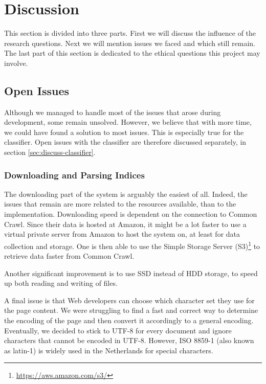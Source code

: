 \chapter{Discussion}\label{sec:discussion}

This section is divided into three parts. First we will discuss the influence of the research questions. Next we will mention issues we faced and which still remain. The last part of this section is dedicated to the ethical questions this project may involve.

\section{Open Issues}\label{sec:Discussion - Open Issues}
Although we managed to handle most of the issues that arose during development, some remain unsolved. However, we believe that with more time, we could have found a solution to most issues. This is especially true for the classifier. Open issues with the classifier are therefore discussed separately, in section \ref{sec:discuss-classifier}.

\subsection{Downloading and Parsing Indices}
The downloading part of the system is arguably the easiest of all. Indeed, the issues that remain are more related to the resources available, than to the implementation. Downloading speed is dependent on the connection to Common Crawl. Since their data is hosted at Amazon, it might be a lot faster to use a virtual private server from Amazon to host the system on, at least for data collection and storage. One is then able to use the Simple Storage Server (S3)\footnote{\url{https://aws.amazon.com/s3/}} to retrieve data faster from Common Crawl.

Another significant improvement is to use SSD instead of HDD storage, to speed up both reading and writing of files.

A final issue is that Web developers can choose which character set they use for the page content. We were struggling to find a fast and correct way to determine the encoding of the page and then convert it accordingly to a general encoding. Eventually, we decided to stick to UTF-8 for every document and ignore characters that cannot be encoded in UTF-8. However, ISO 8859-1 (also known as latin-1) is widely used in the Netherlands for special characters.

